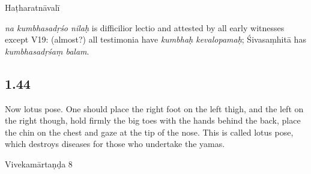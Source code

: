 \begin{ekdosis}
\begin{testimonia}[hp01_043]
\begin{versinnote}
\end{versinnote}

Haṭharatnāvalī

\begin{versinnote}
\end{versinnote}

\end{testimonia}

\begin{philcomm}[hp01_043]
\emph{na kumbhasadṛśo nilaḥ} is difficilior lectio and attested by all early witnesses except V19: (almost?) all testimonia have \emph{kumbhaḥ kevalopamaḥ}; Śivasaṃhitā has \emph{kumbhasadṛśaṃ balam}.
\end{philcomm}

\subsection*{1.44}
\begin{translation}[hp01_044]
Now lotus pose.
One should place the right foot on the left thigh, and the left on the right though, hold firmly the big toes with the hands behind the back, place the chin on the chest and gaze at the tip of the nose. This is called lotus pose, which destroys diseases for those who undertake the yamas.
\end{translation}

\begin{sources}[hp01_044]
Vivekamārtaṇḍa 8

\begin{versinnote}
\end{versinnote}

\end{sources}


\end{ekdosis}
